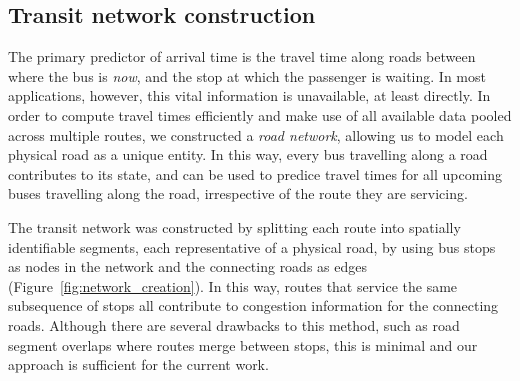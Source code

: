 \subsection{Transit network construction}
\label{sec:network_build}

The primary predictor of arrival time is 
the travel time along roads between where the bus is \emph{now},
and the stop at which the passenger is waiting.
In most applications, however, this vital information is unavailable, at least directly.
In order to compute travel times efficiently
and make use of all available data pooled across multiple routes,
we constructed a \emph{road network},
allowing us to model each physical road as a unique entity.
In this way, every bus travelling along a road contributes to its state,
and can be used to predice travel times for all upcoming buses 
travelling along the road,
irrespective of the route they are servicing.


The transit network was constructed by splitting each route
into spatially identifiable segments,
each representative of a physical road,
by using bus stops as nodes in the network
and the connecting roads as edges
(Figure~\ref{fig:network_creation}).
In this way, routes that service the same subsequence of stops
all contribute to congestion information for the connecting roads.
Although there are several drawbacks to this method,
such as road segment overlaps where routes merge between stops,
this is minimal and our approach is sufficient for the current work.



